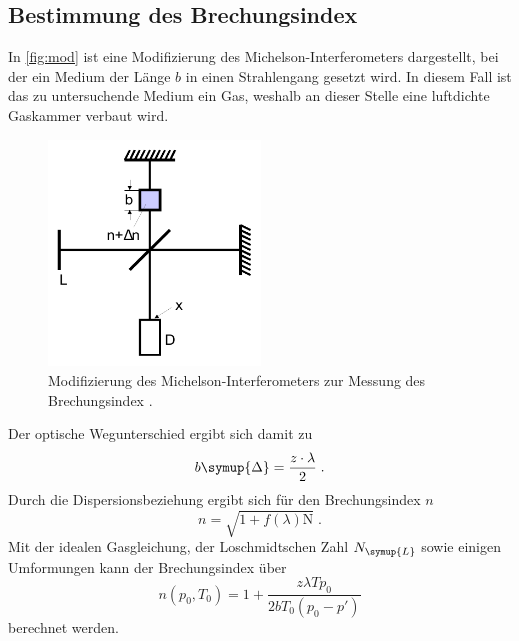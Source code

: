 \subsection{Bestimmung des Brechungsindex}
In \autoref{fig:mod} ist eine Modifizierung des Michelson-Interferometers dargestellt, bei der ein Medium der Länge $b$ in einen Strahlengang 
gesetzt wird. In diesem Fall ist das zu untersuchende Medium ein Gas, weshalb an dieser Stelle eine luftdichte Gaskammer verbaut wird.
\begin{figure}
    \centering
    \includegraphics[height = 6cm]{modbrech.pdf}
    \caption{Modifizierung des Michelson-Interferometers zur Messung des Brechungsindex \cite{ap401}.}
    \label{fig:mod}
\end{figure}
Der optische Wegunterschied ergibt sich damit zu 
\begin{equation*}
    b\symup{\Delta} = \frac{z\cdot\lambda}{2} \; . 
\end{equation*}
Durch die Dispersionsbeziehung ergibt sich für den Brechungsindex $n$
\begin{equation*}
    n = \sqrt{1+f\left(\lambda\right)\text{N}} \; .
\end{equation*}
Mit der idealen Gasgleichung, der Loschmidtschen Zahl $N_{\symup{L}}$ sowie einigen Umformungen kann der Brechungsindex über
\begin{equation}
    n\left(p_0, T_0\right) = 1 + \frac{z\lambda T p_0}{2bT_0\left(p_0-p'\right)}
    \label{eqn:brechung}
\end{equation} 
berechnet werden. 